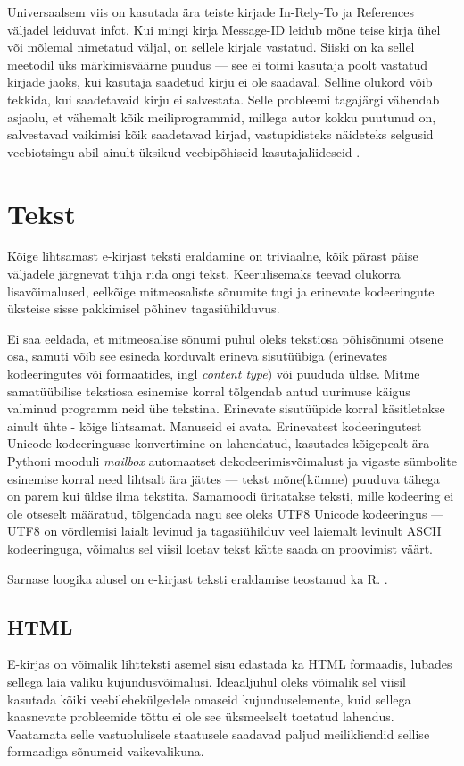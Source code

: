 \documentclass[]{trkuur}
\let\eng\emph
\let\enp\eng
\begin{document}
Universaalsem viis on kasutada ära teiste kirjade In-Rely-To
ja References väljadel leiduvat infot. Kui mingi kirja Message-ID leidub mõne
teise kirja ühel või mõlemal nimetatud väljal, on sellele kirjale vastatud.
Siiski on ka sellel meetodil üks märkimisväärne puudus --- see ei toimi kasutaja
poolt vastatud kirjade jaoks, kui kasutaja saadetud kirju ei ole saadaval.
Selline olukord võib tekkida, kui saadetavaid kirju ei salvestata. Selle
probleemi tagajärgi vähendab asjaolu, et vähemalt kõik meiliprogrammid, millega
autor kokku puutunud on, salvestavad vaikimisi kõik saadetavad kirjad,
vastupidisteks näideteks selgusid veebiotsingu abil ainult üksikud veebipõhiseid
kasutajaliideseid \autocite{yahooSaveSent} \autocite{verioSaveSent}.

\section{Tekst}
Kõige lihtsamast e-kirjast teksti eraldamine on triviaalne, kõik pärast päise
väljadele järgnevat tühja rida ongi tekst. Keerulisemaks teevad olukorra
lisavõimalused, eelkõige mitmeosaliste sõnumite tugi ja erinevate kodeeringute
üksteise sisse pakkimisel põhinev tagasiühilduvus.

Ei saa eeldada, et mitmeosalise sõnumi puhul oleks tekstiosa põhisõnumi otsene
osa, samuti võib see esineda korduvalt erineva sisutüübiga (erinevates kodeeringutes või formaatides, ingl \eng{content type}) või puududa üldse.
Mitme samatüübilise tekstiosa esinemise korral tõlgendab antud uurimuse käigus
valminud programm neid ühe tekstina. Erinevate sisutüüpide korral käsitletakse
ainult ühte - kõige lihtsamat. Manuseid ei avata.
Erinevatest kodeeringutest Unicode kodeeringusse konvertimine on lahendatud,
kasutades kõigepealt ära Pythoni mooduli \enp{mailbox} automaatset
dekodeerimisvõimalust ja vigaste sümbolite esinemise korral need lihtsalt ära
jättes --- tekst mõne(kümne) puuduva tähega on parem kui üldse ilma tekstita.
Samamoodi üritatakse teksti, mille kodeering ei ole otseselt määratud, tõlgendada
nagu see oleks UTF8 Unicode kodeeringus --- UTF8 on võrdlemisi laialt
levinud ja tagasiühilduv veel laiemalt levinult ASCII kodeeringuga, võimalus
sel viisil loetav tekst kätte saada on proovimist väärt.
\autocite{wiki-unicode}

Sarnase loogika alusel on e-kirjast teksti eraldamise teostanud ka
{R. \citeauthor{pyMultilingualMail} \autocite{pyMultilingualMail}}.

\subsection{HTML}
E-kirjas on võimalik lihtteksti asemel sisu edastada ka HTML formaadis,
lubades sellega laia valiku kujundusvõimalusi.
Ideaaljuhul oleks võimalik sel viisil kasutada kõiki veebilehekülgedele omaseid
kujunduselemente, kuid sellega kaasnevate probleemide tõttu ei ole see
üksmeelselt toetatud lahendus. Vaatamata selle vastuolulisele staatusele
saadavad paljud meilikliendid sellise formaadiga sõnumeid vaikevalikuna.
\autocite{wiki-html-email}
\end{document}
